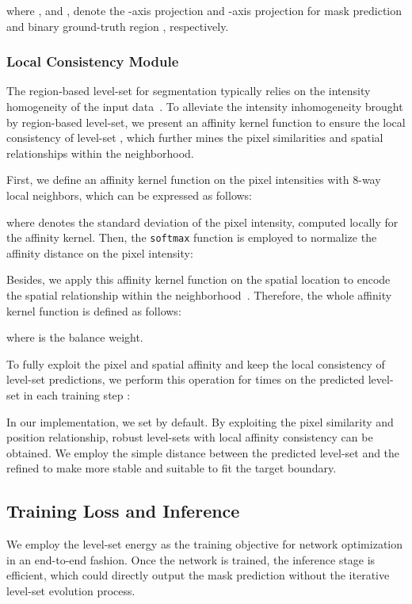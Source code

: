\documentclass[12pt,onecolumn,letterpaper]{article}
\begin{document}
where ,  and ,  denote the -axis projection and -axis projection for mask prediction  and binary ground-truth region , respectively. 

\subsubsection{Local Consistency Module}
The region-based level-set for segmentation typically relies on the intensity homogeneity of the input data~\cite{CVPR2007implicit, tip2011level, tip2019mumford}. 
To alleviate the intensity inhomogeneity brought by region-based level-set,
we present an affinity kernel function to ensure the local consistency of level-set , which further mines the pixel similarities 
and spatial relationships within the neighborhood.

First, we define an affinity kernel function  on the pixel intensities  with 8-way local neighbors, which can be expressed as follows:
\begin{small}
	
\end{small}

\noindent 
where  denotes the standard deviation of the pixel intensity, computed locally for the affinity kernel. Then, the \texttt{softmax} function is employed to normalize the affinity distance  on the pixel intensity:
\begin{small}
	
\end{small}

\noindent Besides, we apply this affinity kernel function on the spatial location to encode the spatial relationship  within the neighborhood~\cite{ru2022learning}. Therefore, the whole affinity kernel function is defined as follows:

where  is the balance weight.

To fully exploit the pixel and spatial affinity and keep the local consistency of level-set predictions, we perform this operation for  times on the predicted level-set  in each training step :


\noindent 
In our implementation, we set  by default. By exploiting the pixel similarity and position relationship, robust level-sets with local affinity consistency can be obtained. We employ the simple  distance between the predicted level-set  and the refined  to make   more stable and suitable to fit the target boundary.

\subsection{Training Loss and Inference}
We employ the level-set energy as the training objective for network optimization in an end-to-end fashion. Once the network is trained, the inference stage is efficient, which could directly output the mask prediction without the iterative level-set evolution process.
\end{document}
